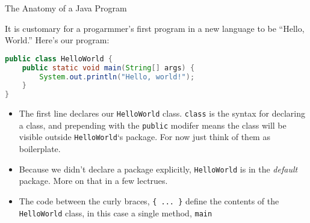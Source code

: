 \documentclass{beamer}
\begin{document}
\begin{frame}[fragile]{The Anatomy of a Java Program}


It is customary for a progarmmer's first program in a new language to be ``Hello, World.''  Here's our  program:
\begin{lstlisting}[language=Java]
public class HelloWorld {
    public static void main(String[] args) {
        System.out.println("Hello, world!");
    }
}
\end{lstlisting}
\vspace{-.1in}
\begin{itemize}
\item The first line declares our {\tt HelloWorld} class.  {\tt class} is the syntax for declaring a class, and prepending with the {\tt public} modifer means the class will be visible outside {\tt HelloWorld}`s package.  For now just think of them as boilerplate.
\item Because we didn't declare a package explicitly, {\tt HelloWorld} is in the {\it default} package.  More on that in a few lectrues.
\item The code between the curly braces, {\tt \{ ... \}} define the contents of the {\tt HelloWorld} class, in this case a single method, {\tt main}
\end{itemize}

\end{frame}
\end{document}
